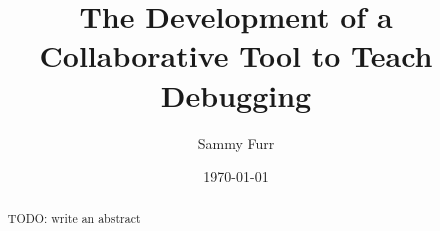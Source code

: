 \message{ !name(paper.tex)}\documentclass[12pt]{article}
\author{Sammy Furr}
\title{The Development of a Collaborative Tool to Teach Debugging}
\date{\today}
\begin{document}


\begin{titlepage}
\maketitle
\end{titlepage}

\begin{abstract}
TODO: write an abstract
\end{abstract}

\tableofcontents
\pagebreak


\end{document}
